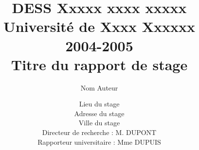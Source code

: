 \documentclass[12pt,a4paper,utf8x,oneside]{report}
\title
{
	\normalsize{DESS Xxxxx xxxx xxxxx\\
	Université de Xxxx Xxxxxx\\
	2004-2005}\\
	\vspace{15mm}
	\Huge{Titre du rapport de stage}
}
\author{Nom Auteur\\
	\vspace{45mm}
}
\date{	
	\normalsize{Lieu du stage\\
	Adresse du stage\\
	Ville du stage\\ 
	\vspace{5mm}	
	Directeur de recherche : M. DUPONT \\
	Rapporteur universitaire : Mme DUPUIS
	}
}
\begin{document}




\tableofcontents
\listoffigures
\listoftables
\clearpage

\begin{onehalfspace}



%








\end{onehalfspace}

\nocite{MotClef1}
\nocite{MotClef2}
\nocite{MotClef3}
\nocite{MotClef4}
\nocite{MotClef5}


\printindex
\appendix

%
%
\clearpage

\end{document}
